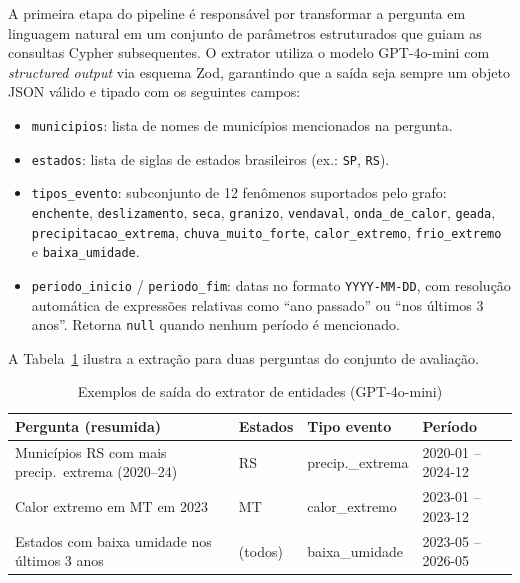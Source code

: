 \documentclass[conference]{IEEEtran}
\begin{document}
A primeira etapa do pipeline é responsável por transformar
a pergunta em linguagem natural em um conjunto de parâmetros
estruturados que guiam as consultas Cypher subsequentes.
O extrator utiliza o modelo GPT-4o-mini com \textit{structured
output} via esquema Zod, garantindo que a saída seja sempre
um objeto JSON válido e tipado com os seguintes campos:

\begin{itemize}
  \item \texttt{municipios}: lista de nomes de municípios
        mencionados na pergunta.
  \item \texttt{estados}: lista de siglas de estados brasileiros
        (ex.: \texttt{SP}, \texttt{RS}).
  \item \texttt{tipos\_evento}: subconjunto de 12 fenômenos
        suportados pelo grafo: \texttt{enchente},
        \texttt{deslizamento}, \texttt{seca}, \texttt{granizo},
        \texttt{vendaval}, \texttt{onda\_de\_calor},
        \texttt{geada}, \texttt{precipitacao\_extrema},
        \texttt{chuva\_muito\_forte}, \texttt{calor\_extremo},
        \texttt{frio\_extremo} e \texttt{baixa\_umidade}.
  \item \texttt{periodo\_inicio} / \texttt{periodo\_fim}:
        datas no formato \texttt{YYYY-MM-DD}, com resolução
        automática de expressões relativas como
        ``ano passado'' ou ``nos últimos 3 anos''.
        Retorna \texttt{null} quando nenhum período é mencionado.
\end{itemize}

A Tabela~\ref{tab:extrator_exemplo} ilustra a extração para
duas perguntas do conjunto de avaliação.

\begin{table}[htbp]
\caption{Exemplos de saída do extrator de entidades (GPT-4o-mini)}
\label{tab:extrator_exemplo}
\begin{center}
\begin{tabular}{p{2.6cm}p{1.0cm}p{1.2cm}p{1.6cm}}
\toprule
\textbf{Pergunta (resumida)} & \textbf{Estados} & \textbf{Tipo evento} & \textbf{Período} \\
\midrule
Municípios RS com mais precip.\ extrema (2020--24)
  & RS & precip.\_extrema & 2020-01 -- 2024-12 \\
\addlinespace
Calor extremo em MT em 2023
  & MT & calor\_extremo & 2023-01 -- 2023-12 \\
\addlinespace
Estados com baixa umidade nos últimos 3 anos
  & (todos) & baixa\_umidade & 2023-05 -- 2026-05 \\
\bottomrule
\end{tabular}
\end{center}
\end{table}
\end{document}
